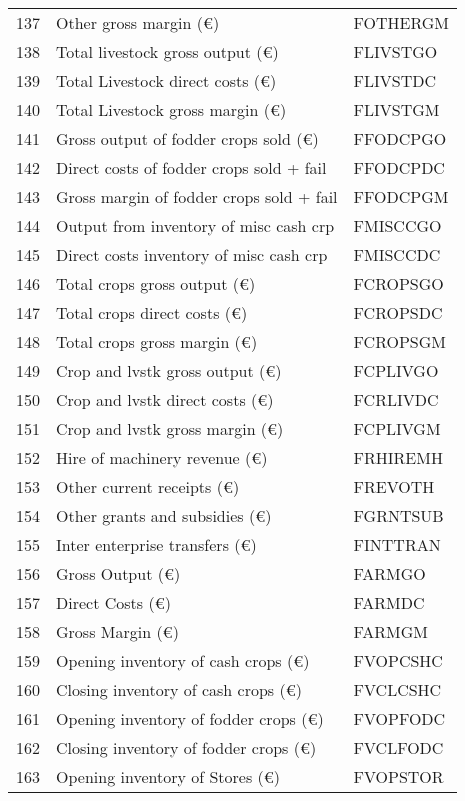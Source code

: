 \documentclass{article}\usepackage{graphicx, color}
\begin{document}
\begin{flushleft}
\begin{table}[ht]
\begin{center}
\begin{tabular}{rll}
  137 & Other    gross margin    (€) & FOTHERGM \\ 
  138 & Total livestock  gross output  (€) & FLIVSTGO \\ 
  139 & Total Livestock  direct costs  (€) & FLIVSTDC \\ 
  140 & Total Livestock  gross margin  (€) & FLIVSTGM \\ 
  141 & Gross output of fodder crops sold (€) & FFODCPGO \\ 
  142 & Direct costs of fodder crops sold + fail & FFODCPDC \\ 
  143 & Gross margin of fodder crops sold + fail & FFODCPGM \\ 
  144 & Output from inventory of misc cash crp & FMISCCGO \\ 
  145 & Direct costs inventory of misc cash crp & FMISCCDC \\ 
  146 & Total crops      gross output  (€) & FCROPSGO \\ 
  147 & Total crops      direct costs  (€) & FCROPSDC \\ 
  148 & Total crops      gross margin  (€) & FCROPSGM \\ 
  149 & Crop and lvstk   gross output  (€) & FCPLIVGO \\ 
  150 & Crop and lvstk   direct costs  (€) & FCRLIVDC \\ 
  151 & Crop and lvstk   gross margin  (€) & FCPLIVGM \\ 
  152 & Hire of machinery revenue      (€) & FRHIREMH \\ 
  153 & Other current receipts         (€) & FREVOTH \\ 
  154 & Other grants and subsidies     (€) & FGRNTSUB \\ 
  155 & Inter enterprise transfers     (€) & FINTTRAN \\ 
  156 & Gross Output                   (€) & FARMGO \\ 
  157 & Direct Costs                   (€) & FARMDC \\ 
  158 & Gross Margin                   (€) & FARMGM \\ 
  159 & Opening inventory of cash crops    (€) & FVOPCSHC \\ 
  160 & Closing inventory of cash crops    (€) & FVCLCSHC \\ 
  161 & Opening inventory of fodder crops  (€) & FVOPFODC \\ 
  162 & Closing inventory of fodder crops  (€) & FVCLFODC \\ 
  163 & Opening inventory of Stores        (€) & FVOPSTOR \\ 

\end{tabular}
\end{center}
\end{table}
\end{flushleft}
\end{document}
